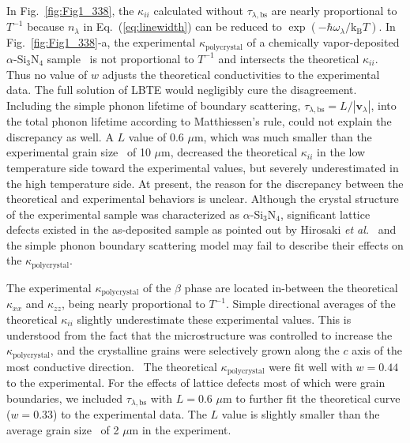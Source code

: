 \documentclass[twocolumn,amsmath,amssymb,a4paper,prb,superscriptaddress,floatfix]{revtex4-1}
\begin{document}
In Fig.~\ref{fig:Fig1_338}, the $\kappa_{ii}$ calculated without
$\tau_{\lambda,\text{bs}}$ are nearly proportional to $T^{-1}$ because
$n_\lambda$ in Eq.~(\ref{eq:linewidth}) can be reduced to
$\exp(-\hbar\omega_\lambda/\mathrm{k_B}T)$. In Fig.~\ref{fig:Fig1_338}-a, the
experimental $\kappa_\mathrm{polycrystal}$ of a chemically vapor-deposited
$\alpha$-Si$_3$N$_4$ sample~\cite{hirai} is not proportional to $T^{-1}$ and
intersects the theoretical $\kappa_{ii}$.  Thus no value of $w$ adjusts the
theoretical conductivities to the experimental data.  The full solution of LBTE
would negligibly cure the disagreement.  Including the simple phonon lifetime of
boundary scattering, $\tau_{\lambda,\text{bs}}=L/|\mathbf{v}_\lambda|$, into the
total phonon lifetime according to Matthiessen's rule, could not explain the
discrepancy as well. A $L$ value of 0.6 $\mu\text{m}$, which was much smaller
than the experimental grain size~\cite{hirai} of 10 $\mu\text{m}$, decreased the
theoretical $\kappa$$_{ii}$ in the low temperature side toward the experimental
values, but severely underestimated in the high temperature side.  At present,
the reason for the discrepancy between the theoretical and experimental
behaviors is unclear.  Although the crystal structure of the experimental sample
was characterized as $\alpha$-Si$_3$N$_4$, significant lattice defects existed
in the as-deposited sample as pointed out by Hirosaki {\it et
al.}~\cite{hirosaki-md} and the simple phonon boundary scattering model may fail
to describe their effects on the $\kappa_\mathrm{polycrystal}$. 

The experimental $\kappa_\mathrm{polycrystal}$ of the $\beta$ phase are located
in-between the theoretical $\kappa$$_{xx}$ and  $\kappa$$_{zz}$, being nearly
proportional to $T^{-1}$. Simple directional averages of the theoretical
$\kappa_{ii}$ slightly underestimate these experimental values.  This is
understood from the fact that the microstructure was controlled to increase the
$\kappa_\mathrm{polycrystal}$, and the crystalline grains were selectively grown
along the $c$ axis of the most conductive direction.~\cite{hirosaki} The
theoretical $\kappa_\mathrm{polycrystal}$ were fit well with $w=0.44$  to the
experimental.  For the effects of lattice defects most of which were grain
boundaries, we included $\tau_{\lambda,\text{bs}}$ with $L=0.6$ $\mu\text{m}$ to
further fit the theoretical curve ($w=0.33$) to the experimental data.  The $L$
value is slightly smaller than the average grain size~\cite{hirosaki} of 2
$\mu\text{m}$ in the experiment.
\end{document}
